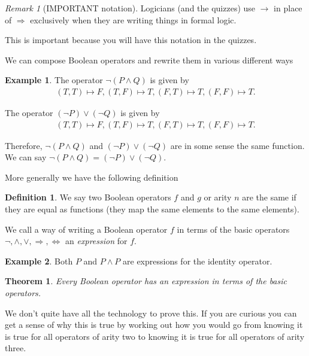 \documentclass[
]{book}
\newtheorem{theorem}{Theorem}[chapter]
\theoremstyle{definition}
\newtheorem{definition}{Definition}[chapter]
\theoremstyle{definition}
\newtheorem{example}{Example}[chapter]
\theoremstyle{definition}
\theoremstyle{definition}
\theoremstyle{remark}
\newtheorem*{remark}{Remark}
\begin{document}
\begin{remark}[IMPORTANT notation]
Logicians (and the quizzes) use \(\rightarrow\) in place of \(\Rightarrow\) exclusively when they are writing things in formal logic.

This is important because you will have this notation in the quizzes.
\end{remark}

We can compose Boolean operators and rewrite them in various different ways

\begin{example}
The operator \(\neg (P \wedge Q)\) is given by
\begin{align*}
(T,T) \mapsto F,
(T,F) \mapsto T,
(F,T) \mapsto T,
(F,F) \mapsto T.
\end{align*}

The operator \((\neg P) \vee (\neg Q)\) is given by
\begin{align*}
(T,T) \mapsto F,
(T,F) \mapsto T,
(F,T) \mapsto T,
(F,F) \mapsto T.
\end{align*}

Therefore, \(\neg(P \wedge Q)\) and \((\neg P) \vee (\neg Q)\) are in some sense the same function. We can say \(\neg(P \wedge Q)=(\neg P) \vee (\neg Q)\).
\end{example}

More generally we have the following definition

\begin{definition}
We say two Boolean operators \(f\) and \(g\) or arity \(n\) are the same if they are equal as functions (they map the same elements to the same elements).

We call a way of writing a Boolean operator \(f\) in terms of the basic operators \(\neg, \wedge, \vee, \Rightarrow, \Leftrightarrow\) an \emph{expression} for \(f\).
\end{definition}

\begin{example}
Both \(P\) and \(P \wedge P\) are expressions for the identity operator.
\end{example}

\begin{theorem}
Every Boolean operator has an expression in terms of the basic operators.
\end{theorem}

We don't quite have all the technology to prove this. If you are curious you can get a sense of why this is true by working out how you would go from knowing it is true for all operators of arity two to knowing it is true for all operators of arity three.
\end{document}
